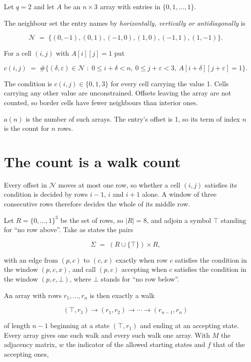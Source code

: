 \documentclass[11pt]{article}
\theoremstyle{definition}
\begin{document}
Let $q = 2$ and let $A$ be an $n \times 3$ array with entries in $\{0,1,\dots,1\}$.

The neighbour set the entry names by {\itshape horizontally, vertically or antidiagonally} is

\[\mathcal{N} \;=\; \{(0,-1), (0,1), (-1,0), (1,0), (-1,1), (1,-1)\}.\]

For a cell $(i,j)$ with $A[i][j] = 1$ put

\[c(i,j) \;=\; \#\bigl\{(\delta,\varepsilon)\in\mathcal{N} \;:\; 0\le i+\delta<n,\ 0\le j+\varepsilon<3,\ A[i+\delta][j+\varepsilon] = 1\bigr\}.\]

The condition is $c(i,j) \in \{0, 1, 3\}$ for every cell carrying the value 1. Cells carrying any other value are unconstrained. Offsets leaving the array are not counted, so border cells have fewer neighbours than interior ones.

$a(n)$ is the number of such arrays. The entry's offset is 1, so its term of index $n$ is the count for $n$ rows.

\section{The count is a walk count}

Every offset in $\mathcal{N}$ moves at most one row, so whether a cell $(i,j)$ satisfies its condition is decided by rows $i-1$, $i$ and $i+1$ alone. A window of three consecutive rows therefore decides the whole of its middle row.

Let $R = \{0,\dots,1\}^{3}$ be the set of rows, so $|R| = 8$, and adjoin a symbol $\top$ standing for ``no row above''. Take as states the pairs

\[\Sigma \;=\; (R \cup \{\top\}) \times R,\]

with an edge from $(p,c)$ to $(c,x)$ exactly when row $c$ satisfies the condition in the window $(p,c,x)$, and call $(p,c)$ accepting when $c$ satisfies the condition in the window $(p,c,\bot)$, where $\bot$ stands for ``no row below''.

An array with rows $r_1,\dots,r_n$ is then exactly a walk

\[(\top,r_1) \to (r_1,r_2) \to \cdots \to (r_{n-1},r_n)\]

of length $n-1$ beginning at a state $(\top,r_1)$ and ending at an accepting state. Every array gives one such walk and every such walk one array. With $M$ the adjacency matrix, $w$ the indicator of the allowed starting states and $f$ that of the accepting ones,
\end{document}
